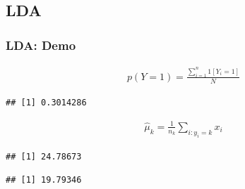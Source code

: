 \documentclass[
  shownotes,
  xcolor={svgnames},
  hyperref={colorlinks,citecolor=DarkBlue,linkcolor=DarkRed,urlcolor=DarkBlue}
  , aspectratio=169]{beamer}
\newenvironment{Shaded}{\begin{snugshade}}{\end{snugshade}}
\newcommand{\DecValTok}[1]{\textcolor[rgb]{0.00,0.00,0.81}{#1}}
\newcommand{\KeywordTok}[1]{\textcolor[rgb]{0.13,0.29,0.53}{\textbf{#1}}}
\newcommand{\NormalTok}[1]{#1}
\newcommand{\OperatorTok}[1]{\textcolor[rgb]{0.81,0.36,0.00}{\textbf{#1}}}
\begin{document}
\subsection{LDA}
\begin{frame}[fragile]
\frametitle{LDA: Demo}
\begin{scriptsize}
\begin{align}
    p(Y=1) = \frac{\sum_{i=1}^n 1[Y_i=1]}{N}
  \end{align}


\begin{Shaded}
\end{Shaded}
\begin{verbatim}
## [1] 0.3014286
\end{verbatim}
\end{scriptsize}
\begin{scriptsize}
\begin{align}
\hat{\mu}_k=\frac{1}{n_k}\sum_{i:y_i=k}x_i
\end{align}


\begin{Shaded}
\end{Shaded}

\begin{verbatim}
## [1] 24.78673
\end{verbatim}

\begin{Shaded}
\end{Shaded}

\begin{verbatim}
## [1] 19.79346
\end{verbatim}
\end{scriptsize}

\end{frame}
\end{document}
